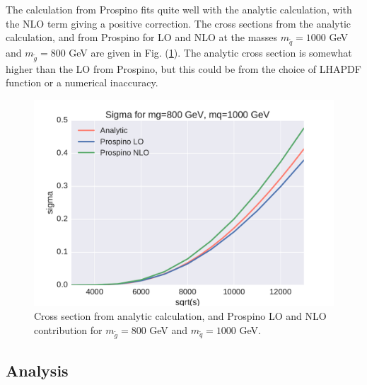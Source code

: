 \documentclass[11pt]{article}
\begin{document}
\begin{flushleft}
The calculation from Prospino fits quite well with the analytic calculation, with the NLO term giving a positive correction. The cross sections from the analytic calculation, and from Prospino for LO and NLO at the masses $m_{\tilde{q}}=1000$ GeV and $m_{\tilde{g}}=800$ GeV are given in Fig. (\ref{fig:: prospino analytic comparison 800 1000}). The analytic cross section is somewhat higher than the LO from Prospino, but this could be from the choice of LHAPDF function or a numerical inaccuracy.
\end{flushleft}
\begin{figure}[H]
\centering
\includegraphics[scale=0.6]{plots/prospino_compare.pdf}
\caption{Cross section from analytic calculation, and Prospino LO and NLO contribution for $m_{\tilde{g}}=800$ GeV and $m_{\tilde{q}}=1000$ GeV.}
\label{fig:: prospino analytic comparison 800 1000}
\end{figure}

\subsection*{Analysis}
\end{document}
